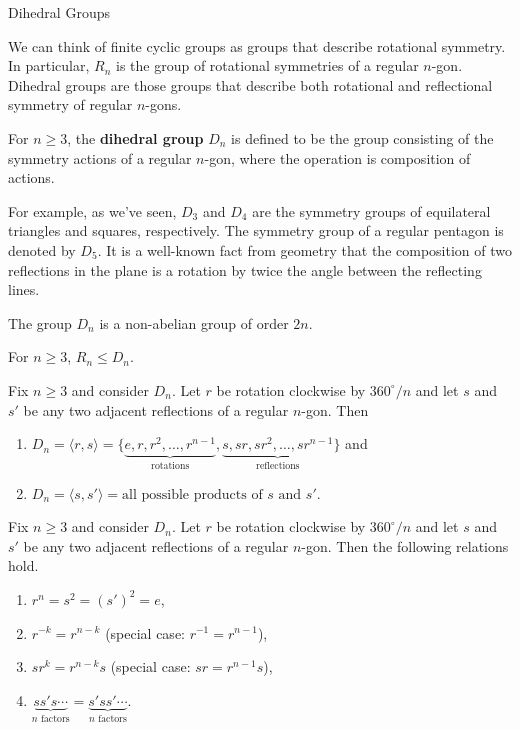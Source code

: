 \begin{section}{Dihedral Groups}

We can think of finite cyclic groups as groups that describe rotational symmetry.  In particular, $R_n$ is the group of rotational symmetries of a regular $n$-gon.  Dihedral groups are those groups that describe both rotational and reflectional symmetry of regular $n$-gons.

\begin{definition}\label{def:dihedral}
For $n\geq 3$, the \textbf{dihedral group} $D_n$ is defined to be the group consisting of the symmetry actions of a regular $n$-gon, where the operation is composition of actions.
\end{definition}

For example, as we've seen, $D_3$ and $D_4$ are the symmetry groups of equilateral triangles and squares, respectively.  The symmetry group of a regular pentagon is denoted by $D_5$.  It is a well-known fact from geometry that the composition of two reflections in the plane is a rotation by twice the angle between the reflecting lines.

\begin{theorem}
The group $D_n$ is a non-abelian group of order $2n$.
\end{theorem}

\begin{theorem}
For $n\geq 3$, $R_n\leq D_n$.
\end{theorem}

\begin{theorem}\label{thm:generators_Dn}
Fix $n\geq 3$ and consider $D_n$. Let $r$ be rotation clockwise by $360^{\circ}/n$  and let $s$ and $s'$ be any two adjacent reflections of a regular $n$-gon.  Then
\begin{enumerate}[label=\rm{(\alph*)}]
\item $D_n=\langle r,s\rangle =\{\underbrace{e,r,r^2,\ldots, r^{n-1}}_{\text{rotations}},\underbrace{s,sr,sr^2,\ldots,sr^{n-1}}_{\text{reflections}}\}$ and
\item $D_n=\langle s,s'\rangle = \text{all possible products of }s\text{ and }s'$.
\end{enumerate}
\end{theorem}

\begin{theorem}
Fix $n\geq 3$ and consider $D_n$. Let $r$ be rotation clockwise by $360^{\circ}/n$  and let $s$ and $s'$ be any two adjacent reflections of a regular $n$-gon.  Then the following relations hold.
\begin{enumerate}[label=\rm{(\alph*)}]
\item $r^n = s^2 = (s')^2 =e$,
\item $r^{-k} = r^{n-k}$ (special case: $r^{-1}=r^{n-1}$),
\item $sr^k=r^{n-k}s$ (special case: $sr=r^{n-1}s$),
\item $\underbrace{ss's\cdots}_{n\text{ factors}}=\underbrace{s'ss'\cdots}_{n\text{ factors}}$.
\end{enumerate}
\end{theorem}


\end{section}
